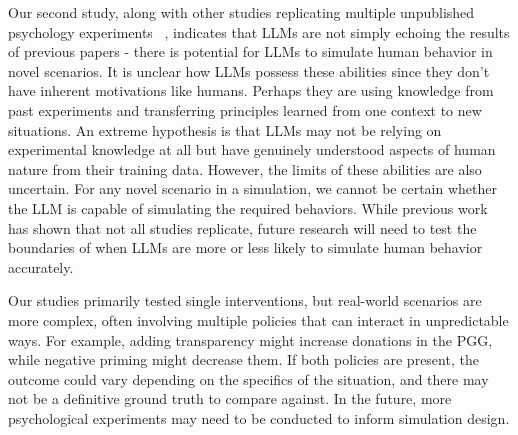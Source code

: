 
Our second study, along with other studies replicating multiple unpublished psychology experiments ~\cite{hewitt2024predicting}, indicates that LLMs are not simply echoing the results of previous papers - there is potential for LLMs to simulate human behavior in novel scenarios. It is unclear how LLMs possess these abilities since they don't have inherent motivations like humans. Perhaps \color{black} they are using knowledge from past experiments and transferring principles learned from one context to new situations. An extreme hypothesis is that LLMs may not be relying on experimental knowledge at all but have genuinely understood aspects of human nature from their training data. However, the limits of these abilities are also uncertain. For any novel scenario in a simulation, we cannot be certain whether the LLM is capable of simulating the required behaviors. While previous work has shown that not all studies replicate, future research will need to test the boundaries of when LLMs are more or less likely to simulate human behavior accurately.

Our studies primarily tested single interventions, but real-world scenarios are more complex, often involving multiple policies that can interact in unpredictable ways. For example, adding transparency might increase donations in the PGG, while negative priming might decrease them. If both policies are present, the outcome could vary depending on the specifics of the situation, and there may not be a definitive ground truth to compare against. In the future, more psychological experiments may need to be conducted to inform simulation design.

